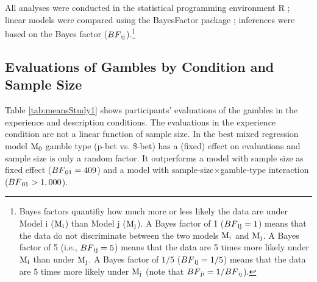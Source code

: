 \documentclass[a4paper, man, floatsintext]{apa6}
\title{}
\author{Jana B. Jarecki}
\date{16 September, 2019}
\let\rmarkdownfootnote\footnote%
\def\footnote{\protect\rmarkdownfootnote}
\begin{document}
All analyses were conducted in the statistical programming environment R
\citep{R2019}; linear models were compared using the BayesFactor package
\citep{BayesFactor}; inferences were based on the Bayes factor
(\(BF\textsubscript{ij}\)).\footnote{Bayes factors quantifiy how much more or less likely the data are under Model i ($\mathrm{M}\textsubscript{i}$) than Model j ($\mathrm{M}\textsubscript{j}$). A Bayes factor of 1 ($BF\textsubscript{ij} = 1$) means that the data do not discriminate between the two models $\mathrm{M}\textsubscript{i}$ and $\mathrm{M}\textsubscript{j}$. A Bayes factor of 5 (i.e., $BF\textsubscript{ij} = 5$) means that the data are 5 times more likely under $\mathrm{M}\textsubscript{i}$ than under $\mathrm{M}\textsubscript{j}$. A Bayes factor of $1/5$ ($BF\textsubscript{ij} = 1/5$) means that the data are 5 times more likely under $\mathrm{M}\textsubscript{j}$ (note that $BF\textsubscript{ji} = 1/BF\textsubscript{ij}$).}

\subsection{Evaluations of Gambles by Condition and Sample Size}

Table \ref{tab:meansStudy1} shows participants' evaluations of the
gambles in the experience and description conditions. The evaluations in
the experience condition are not a linear function of sample size. In
the best mixed regression model \(\mathrm{M}\textsubscript{0}\) gamble
type (p-bet vs. \$-bet) has a (fixed) effect on evaluations and sample
size is only a random factor. It outperforms a model with sample size as
fixed effect (\(BF\textsubscript{01} = 409\)) and a model with
sample-size\(\times\)gamble-type interaction
(\(BF\textsubscript{01} > 1,000\)).
\end{document}
